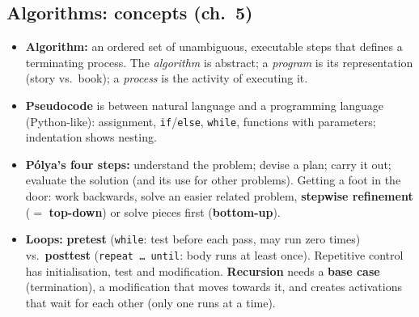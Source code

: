 \documentclass{fkt-notes}
\begin{document}
\subsection{Algorithms: concepts (ch.~5)}
\begin{itemize}[nosep]
  \item \textbf{Algorithm:} an ordered set of unambiguous, executable steps that defines a terminating process. The \emph{algorithm} is abstract; a \emph{program} is its
        representation (story vs.\ book); a \emph{process} is the activity of executing it.
  \item \textbf{Pseudocode} is between natural language and a programming language (Python-like): assignment, \texttt{if}/\texttt{else}, \texttt{while}, functions with parameters; indentation shows nesting.
  \item \textbf{P\'olya's four steps:} understand the problem; devise a plan; carry it out; evaluate the solution (and its use for other problems). Getting a foot in the door: work backwards,
        solve an easier related problem, \textbf{stepwise refinement} ($=$ \textbf{top-down}) or solve pieces first (\textbf{bottom-up}).
  \item \textbf{Loops:} \textbf{pretest} (\texttt{while}: test before each pass, may run zero times) vs.\ \textbf{posttest} (\texttt{repeat \dots\ until}: body runs at least once).
        Repetitive control has initialisation, test and modification. \textbf{Recursion} needs a \textbf{base case} (termination), a modification that moves towards it, and creates
        activations that wait for each other (only one runs at a time).
\end{itemize}
\end{document}

